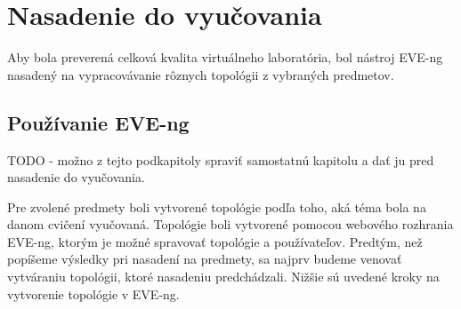 \chapter{Nasadenie do vyučovania}
\label{chap:nasadenie_do_vyucovania}

Aby bola preverená celková kvalita virtuálneho laboratória, bol nástroj EVE-ng nasadený na vypracovávanie rôznych topológii z vybraných predmetov. 




\section{Používanie EVE-ng}
\label{chap:pouzivanie_eve_ng}

{\huge TODO - možno z tejto podkapitoly spraviť samostatnú kapitolu a dať ju pred nasadenie do vyučovania.}

Pre zvolené predmety boli vytvorené topológie podľa toho, aká téma bola na danom cvičení vyučovaná. Topológie boli vytvorené pomocou webového rozhrania EVE-ng, ktorým je možné spravovať topológie a používateľov. Predtým, než popíšeme výsledky pri nasadení na predmety, sa najprv budeme venovať vytváraniu topológii, ktoré nasadeniu predchádzali. Nižšie sú uvedené kroky na vytvorenie topológie v EVE-ng.

